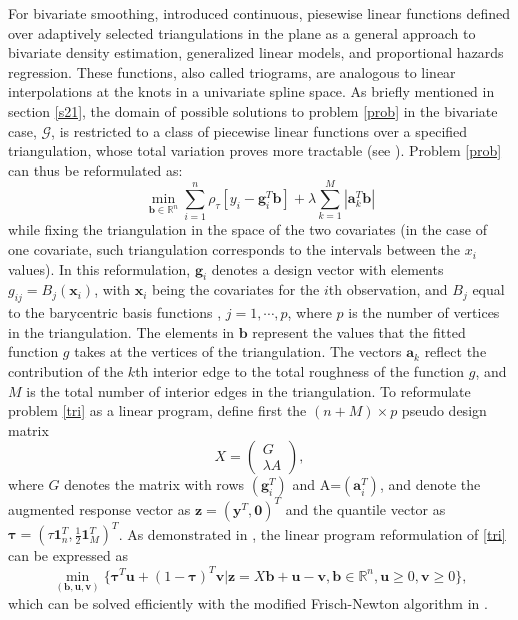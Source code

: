 \documentclass{statsoc}
\begin{document}
For bivariate smoothing, \citet{hansen1998triogram} introduced continuous, piesewise linear functions defined over adaptively selected triangulations in the plane as a general approach to bivariate density estimation, generalized linear models, and proportional hazards regression. These functions, also called triograms, are analogous to linear interpolations at the knots in a univariate spline space. As briefly mentioned in section \ref{s21}, the domain of possible solutions to problem \eqref{prob} in the bivariate case, $\mathcal{G}$, is restricted to a class of piecewise linear functions over a specified triangulation, whose total variation proves more tractable (see \citet{koenker2004penalized}). Problem \eqref{prob} can thus be reformulated as:
\begin{equation}
    \label{tri}
    \min_{\boldsymbol{b}\in \mathbb{R}^n}\sum_{i=1}^n \rho_{\tau}[y_i - \boldsymbol{g}_i^T\boldsymbol{b}] + \lambda\sum_{k=1}^{M} |\boldsymbol{a}_k^T\boldsymbol{b}|
\end{equation}
while fixing the triangulation in the space of the two covariates (in the case of one covariate, such triangulation corresponds to the intervals between the $x_i$ values). In this reformulation, $\boldsymbol{g}_i$ denotes a  design vector with elements $g_{ij}=B_j(\boldsymbol{x}_i)$, with $\boldsymbol{x}_i$ being the covariates for the $i$th observation, and $B_j$ equal to the barycentric basis functions \citep{koenker2004penalized}, $j=1,\cdots,p$, where $p$ is the number of vertices in the triangulation. The elements in $\boldsymbol{b}$ represent the values that the fitted function $g$ takes at the vertices of the triangulation. The vectors $\boldsymbol{a}_k$ reflect the contribution of the $k$th interior edge to the total roughness of the function $g$, and $M$ is the total number of interior edges in the triangulation. To reformulate problem \eqref{tri} as a linear program, define first the $(n+M)\times p$ pseudo design matrix
\begin{equation}
    \label{design}
    X=\begin{pmatrix}
G\\ 
\lambda A
\end{pmatrix},
\end{equation}
where $G$ denotes the matrix with rows $(\boldsymbol{g}_i^T)$ and A=$(\boldsymbol{a}_i^T)$, and denote the augmented response vector as $\boldsymbol{z}=(\boldsymbol{y}^T,\boldsymbol{0})^T$ and the quantile vector as $\boldsymbol{\tau}=(\tau \boldsymbol{1}_n^T,\frac{1}{2}\boldsymbol{1}_M^T)^T$. As demonstrated in \citet{koenker2005inequality}, the linear program reformulation of \eqref{tri} can be expressed as
\begin{equation}
    \label{linear}
    \min_{(\boldsymbol{b},\boldsymbol{u},\boldsymbol{v})}\{\boldsymbol{\tau}^T \boldsymbol{u}+(1-\boldsymbol{\tau})^T\boldsymbol{v}|\boldsymbol{z}=X\boldsymbol{b}+\boldsymbol{u}-\boldsymbol{v},\boldsymbol{b}\in \mathbb{R}^n, \boldsymbol{u}\geq 0, \boldsymbol{v} \geq 0\},
\end{equation}
which can be solved efficiently with the modified Frisch-Newton algorithm in \citet{koenker2005frisch}.
\end{document}
